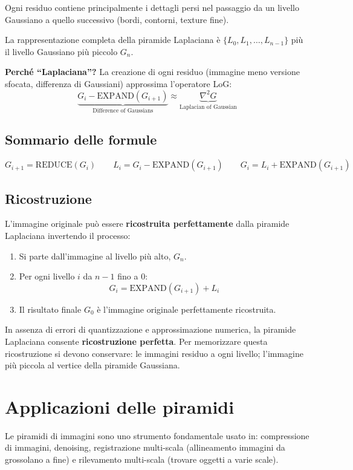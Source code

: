 \documentclass[12pt, a4paper]{report}
\begin{document}
Ogni residuo contiene principalmente i dettagli persi nel passaggio da un livello
Gaussiano a quello successivo (bordi, contorni, texture fine).

La rappresentazione completa della piramide Laplaciana è
$\{L_0,L_1,\ldots,L_{n-1}\}$ più il livello Gaussiano più piccolo $G_n$.

\textbf{Perché ``Laplaciana''?}  La creazione di ogni residuo (immagine meno versione
sfocata, differenza di Gaussiani) approssima l'operatore LoG:
\[
  \underbrace{G_i - \mathrm{EXPAND}(G_{i+1})}_{\text{Difference of Gaussians}}
  \approx
  \underbrace{\nabla^2 G}_{\text{Laplacian of Gaussian}}
\]

\subsection{Sommario delle formule}

\[
\boxed{
  G_{i+1} = \mathrm{REDUCE}(G_i) \qquad
  L_i = G_i - \mathrm{EXPAND}(G_{i+1}) \qquad
  G_i = L_i + \mathrm{EXPAND}(G_{i+1})
}
\]

\subsection{Ricostruzione}

L'immagine originale può essere \textbf{ricostruita perfettamente} dalla piramide
Laplaciana invertendo il processo:
\begin{enumerate}
  \item Si parte dall'immagine al livello più alto, $G_n$.
  \item Per ogni livello $i$ da $n-1$ fino a 0:
        \[G_i = \mathrm{EXPAND}(G_{i+1}) + L_i\]
  \item Il risultato finale $G_0$ è l'immagine originale perfettamente ricostruita.
\end{enumerate}

In assenza di errori di quantizzazione e approssimazione numerica, la piramide
Laplaciana consente \textbf{ricostruzione perfetta}.  Per memorizzare questa
ricostruzione si devono conservare: le immagini residuo a ogni livello; l'immagine
più piccola al vertice della piramide Gaussiana.

\section{Applicazioni delle piramidi}

Le piramidi di immagini sono uno strumento fondamentale usato in: compressione di
immagini, denoising, registrazione multi-scala (allineamento immagini da grossolano
a fine) e rilevamento multi-scala (trovare oggetti a varie scale).
\end{document}
